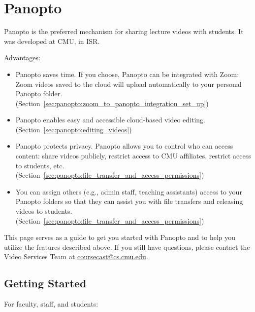 \chapter{Panopto}
\label{ch:panopto}

\begin{gram}[Introduction]
\label{grm:panopto:introduction}
	Panopto is the preferred mechanism for sharing lecture videos with students. It was developed at CMU, in ISR.

	Advantages:
	\begin{itemize}
		\item Panopto saves time. If you choose, Panopto can be integrated with Zoom: Zoom videos saved to the cloud will upload automatically to your personal Panopto folder. (Section~\ref{sec:panopto:zoom_to_panopto_integration_set_up})
		\item Panopto enables easy and accessible cloud-based video editing. (Section~\ref{sec:panopto:editing_videos})
		\item Panopto protects privacy. Panopto allows you to control who can access content: share videos publicly, restrict access to CMU affiliates, restrict access to students, etc. (Section~\ref{sec:panopto:file_transfer_and_access_permissions})
		\item You can assign others (e.g., admin staff, teaching assistants) access to your Panopto folders so that they can assist you with file transfers and releasing videos to students. (Section~\ref{sec:panopto:file_transfer_and_access_permissions})
	\end{itemize}

	\begin{note}
		This page serves as a guide to get you started with Panopto and to help you utilize the features described above. If you still have questions, please contact the Video Services Team at \href{mailto:coursecast@cs.cmu.edu}{coursecast@cs.cmu.edu}.
	\end{note}
\end{gram}


\section{Getting Started}
\label{sec:panopto:getting_started}


For faculty, staff, and students:

